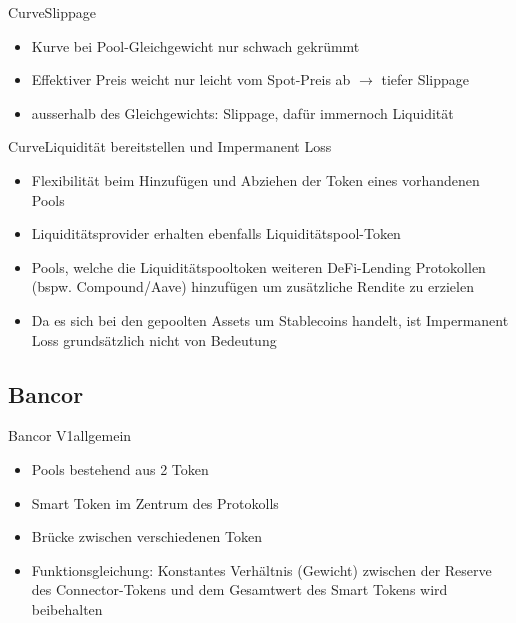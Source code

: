 \documentclass{beamer}
\begin{document}
\begin{frame}{Curve}{Slippage}
\begin{itemize}
 \item{Kurve bei Pool-Gleichgewicht nur schwach gekrümmt}
 \item{Effektiver Preis weicht nur leicht vom Spot-Preis ab $\rightarrow$ tiefer Slippage}
 \item{ausserhalb des Gleichgewichts: Slippage, dafür immernoch Liquidität}
\end{itemize}
\end{frame}

\begin{frame}{Curve}{Liquidität bereitstellen und Impermanent Loss}
\begin{itemize}
 \item<1->{Flexibilität beim Hinzufügen und Abziehen der Token eines vorhandenen Pools}
 \item<1->{Liquiditätsprovider erhalten ebenfalls Liquiditätspool-Token}
 \item<1->{Pools, welche die Liquiditätspooltoken weiteren DeFi-Lending Protokollen (bspw. Compound/Aave) hinzufügen um zusätzliche Rendite zu erzielen}
 \vspace{2em}
 \item<2->{Da es sich bei den gepoolten Assets um Stablecoins handelt, ist Impermanent Loss grundsätzlich nicht von Bedeutung}
\end{itemize}
\end{frame}


\subsection{Bancor}

\begin{frame}{Bancor V1}{allgemein}
\begin{itemize}
  \item{Pools bestehend aus 2 Token}
  \item{Smart Token im Zentrum des Protokolls}
  \item{Brücke zwischen verschiedenen Token}
  \item{Funktionsgleichung: Konstantes Verhältnis (Gewicht) zwischen der Reserve des Connector-Tokens und dem Gesamtwert des Smart Tokens wird beibehalten}
\end{itemize}
\end{frame}
\end{document}
